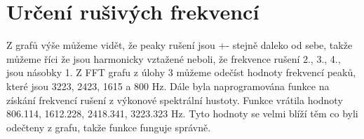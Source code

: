 \section{Určení rušivých frekvencí}
\label{sec:noise_freq}

Z grafů výše můžeme vidět, že peaky rušení jsou +- stejně daleko od sebe, takže můžeme říci že jsou harmonicky vztažené neboli, že frekvence rušení 2., 3., 4., jsou násobky 1.
Z FFT grafu z úlohy 3 můžeme odečíst hodnoty frekvencí peaků, které jsou 3223, 2423, 1615 a 800 Hz.
Dále byla naprogramována funkce na získání frekvencí rušení z výkonové spektrální hustoty.
Funkce vrátila hodnoty 806.114, 1612.228, 2418.341, 3223.323 Hz.
Tyto hodnoty se velmi blíží těm co byli odečteny z grafu, takže funkce funguje správně.